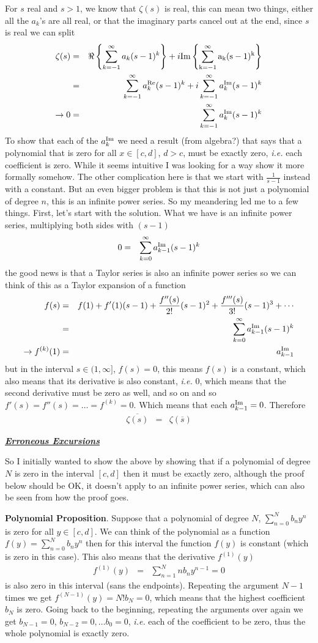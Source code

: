 \documentclass[aps,preprint,preprintnumbers,nofootinbib,showpacs,prd]{revtex4-1}
\newcommand{\ie}{{\it i.e.} }
\newcommand{\nbea}{\begin{eqnarray*}}
\newcommand{\neea}{\end{eqnarray*}}
\def\Im{\rm Im}
\begin{document}
For $s$ real and $s > 1$, we know that $\zeta(s)$ is real, this can mean two things, either all the $a_k$'s are all real, or that the imaginary parts cancel out at the end, since $s$ is real we can split
%
\nbea
\zeta(s) & = & \Re\left\{\sum_{k=-1}^\infty a_k (s-1)^k\right\} + i\Im\left\{ \sum_{k=-1}^\infty a_k (s-1)^k \right\} \\
& = & \sum_{k=-1}^\infty a^{\rm Re}_k (s-1)^k + i\sum_{k=-1}^\infty a^{\rm Im}_k (s-1)^k \\
\to 0 & = & \sum_{k=-1}^\infty a^{\rm Im}_k (s-1)^k
\neea
%
To show that each of the $a^{\rm Im}_k$ we need a result (from algebra?) that says that a polynomial that is zero for all $x\in [c,d]$, $d > c$, must be exactly zero, \ie each coefficient is zero. While it seems intuitive I was looking for a way show it more formally somehow. The other complication here is that we start with $\frac{1}{s-1}$ instead with a constant. But an even bigger problem is that this is not just a polynomial of degree $n$, this is an infinite power series. So my meandering led me to a few things. First, let's start with the solution. What we have is an infinite power series, multiplying both sides with $(s-1)$
%
\nbea
0 & = & \sum_{k=0}^\infty a_{k-1}^{\rm Im} (s-1)^k 
\neea
%
the good news is that a Taylor series is also an infinite power series so we can think of this as a Taylor expansion of a function
%
\nbea
f(s) & = & f(1) + f'(1)(s-1) + \frac{f''(s)}{2!}(s-1)^2 + \frac{f'''(s)}{3!}(s-1)^3 + \cdots \\
& = & \sum_{k=0}^\infty a_{k-1}^{\rm Im} (s-1)^k \\
\to f^{(k)}(1) & = & a_{k-1}^{\rm Im}
\neea
%
but in the interval $s \in (1,\infty]$, $f(s) = 0$, this means $f(s)$ is a constant, which also means that its derivative is also constant, \ie 0, which means that the second derivative must be zero as well, and so on and so $f'(s) = f''(s) = \dots = f^{(k)} = 0$. Which means that each $a_{k-1}^{\rm Im} = 0$. Therefore
%
\nbea
\overline{\zeta(s)} & = & \zeta(\overline{s})
\neea
%

\bigskip
\underline{\textbf{\textit{Erroneous Excursions}}}

So I initially wanted to show the above by showing that if a polynomial of degree $N$ is zero in the interval $[c,d]$ then it must be exactly zero, although the proof below should be OK, it doesn't apply to an infinite power series, which can also be seen from how the proof goes.

{\bf Polynomial Proposition}. Suppose that a polynomial of degree $N$, $\sum_{n=0}^N b_n y^n$ is zero for all $y \in [c,d]$. We can think of the polynomial as a function $f(y) = \sum_{n=0}^N b_n y^n$ then for this interval the function $f(y)$ is constant (which is zero in this case). This also means that the derivative $f^{(1)}(y)$ 
%
\nbea
f^{(1)}(y) & = & \sum_{n=1}^N n b_n y^{n-1} = 0
\neea
%
is also zero in this interval (sans the endpoints). Repeating the argument $N-1$ times we get $f^{(N-1)}(y) = N! b_N = 0$, which means that the highest coefficient $b_N$ is zero. Going back to the beginning, repeating the arguments over again we get $b_{N-1} = 0$, $b_{N-2} = 0, \dots b_0 = 0$, \ie each of the coefficient to be zero, thus the whole polynomial is exactly zero.
\end{document}
